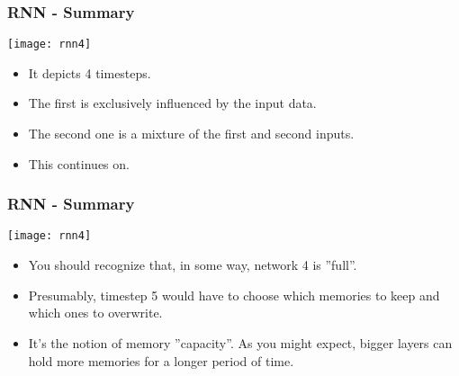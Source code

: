 
\begin{frame}[fragile] \frametitle{RNN - Summary}
\begin{center}
\texttt{[image: rnn4]}
\end{center}
\begin{itemize}
\item It depicts 4 timesteps. 
\item The first is exclusively influenced by the input data. 
\item The second one is a mixture of the first and second inputs. 
\item This continues on. 
\end{itemize}
\end{frame}

\begin{frame}[fragile] \frametitle{RNN - Summary}
\begin{center}
\texttt{[image: rnn4]}
\end{center}
\begin{itemize}
\item You should recognize that, in some way, network 4 is ''full''. 
\item Presumably, timestep 5 would have to choose which memories to keep and which ones to overwrite. 
\item It's the notion of memory ''capacity''. As you might expect, bigger layers can hold more memories for a longer period of time.
\end{itemize}
\end{frame}


